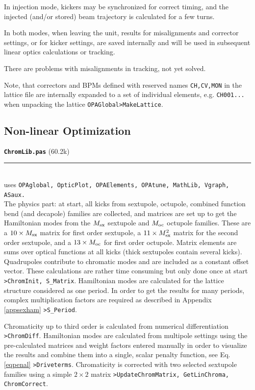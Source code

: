 \documentclass[12pt]{article}
\newcommand\code[1]{{\tt #1}}
\newcommand{\todo}[1]{{\color{red} #1}}
\newcommand\opamodule[3]{{\bf \tt #1} #2\\  \rule[3pt]{\textwidth}{0.2pt} \\ {\scriptsize uses \tt  #3}\\[1ex]}
\begin{document}
In injection mode, kickers may be synchronized for correct timing, and the injected (and/or stored) beam trajectory is calculated for a few turns.

In both modes, when leaving the unit, results for misalignments and corrector settings, or for kicker settings, are saved internally and will be used in subsequent linear optics calculations or tracking.

\todo{There are problems with misalignments in tracking, not yet solved.}

Note, that correctors and BPMs defined with reserved names {\tt CH,CV,MON} in the lattice file are internally expanded to a set of individual elements, e.g. {\tt CH001...} when unpacking the lattice \code{OPAGlobal>MakeLattice}.


\subsection{Non-linear Optimization}

\opamodule{ChromLib.pas}{(60.2k)}{OPAglobal, OpticPlot, OPAElements, OPAtune,  MathLib, Vgraph, ASaux.}
The physics part: at start, all kicks from sextupole, octupole, combined function bend (and decapole) families are collected, and matrices are set up to get the Hamiltonian modes from the $M_{\rm sx}$ sextupole and $M_{\rm oc}$ octupole families. These are a $10\times  M_{\rm sx}$ matrix for first order sextupole, a $11\times  M_{\rm sx}^2$ matrix for the second order sextupole, and a  $13\times  M_{\rm oc}$ for first order octupole. Matrix elements are sums over optical functions at all kicks (thick sextupoles contain several kicks). Quadrupoles contribute to chromatic modes and are included as a constant offset vector. These calculations are rather time consuming but only done once at start \code{>ChromInit, S\_Matrix}. Hamiltonian modes are calculated for the lattice structure considered as one period. In order to get the results for many periods, complex multiplication factors are required as described in Appendix \ref{appsexham} \code{>S\_Period}.

Chromaticity up to third order is calculated from numerical differentiation \code{>ChromDiff}. Hamiltonian modes are calculated from multipole settings using the pre-calculated matrices and weight factors entered manually in order to visualize the results and combine them into a single, scalar penalty function, see Eq.\ref{eqpenal} \code{>Driveterms}. Chromaticity is corrected with two selected sextupole families using a simple $2\times 2$ matrix \code{>UpdateChromMatrix, GetLinChroma, ChromCorrect}.
\end{document}
